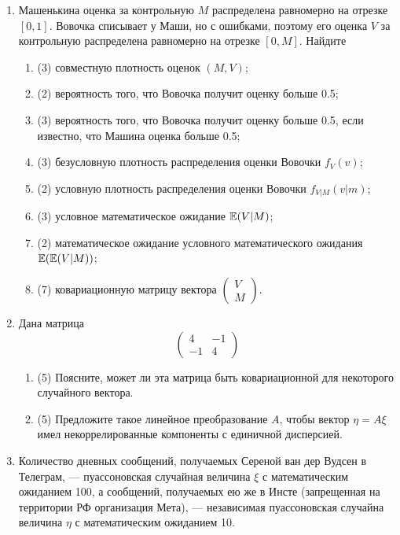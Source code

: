 \begin{enumerate}
	\item Машенькина оценка за контрольную $M$ распределена равномерно на отрезке $[0,1]$. Вовочка списывает у Маши, но с ошибками, поэтому его оценка $V$ за контрольную распределена равномерно на отрезке $[0, M]$.
	Найдите
		\begin{enumerate}
	\item (3) совместную плотность оценок $(M,V)$; 
	\item (2) вероятность того, что Вовочка получит оценку больше 0.5;
	\item (3) вероятность того, что Вовочка получит оценку больше 0.5, если известно, что Машина оценка больше 0.5;
	\item (3) безусловную плотность распределения оценки Вовочки $f_V (v)$;
	\item (2) условную плотность распределения оценки Вовочки $f_{V|M} (v|m)$;
	\item (3) условное математическое ожидание $\operatorname{\mathbb{E}}(V|M)$;
	\item (2) математическое ожидание условного математического ожидания $\operatorname{\mathbb{E}}(\operatorname{\mathbb{E}}(V|M))$;
	\item (7) ковариационную матрицу вектора $\left(\begin{array}{c}
		V \\
		M
	\end{array}\right)$.
\end{enumerate}

\item Дана матрица 
\[\left(\begin{array}{cc}
	4 & -1 \\
	-1 & 4
\end{array}\right)
\]
	\begin{enumerate}
		\item (5) Поясните, может ли эта матрица быть ковариационной для некоторого случайного вектора.
		\item (5) Предложите такое линейное преобразование $A$, чтобы вектор $\eta=A\xi$ имел 
		некоррелированные компоненты с единичной дисперсией.
	\end{enumerate}
	
    \item Количество дневных сообщений, получаемых Сереной ван дер Вудсен в Телеграм, 
    — пуассоновская случайная величина $\xi$ с математическим ожиданием 100, а сообщений, 
    получаемых ею же в Инсте (запрещенная на территории РФ организация Мета), 
    — независимая пуассоновская случайна величина $\eta$ с математическим ожиданием 10. 
    

\end{enumerate}
